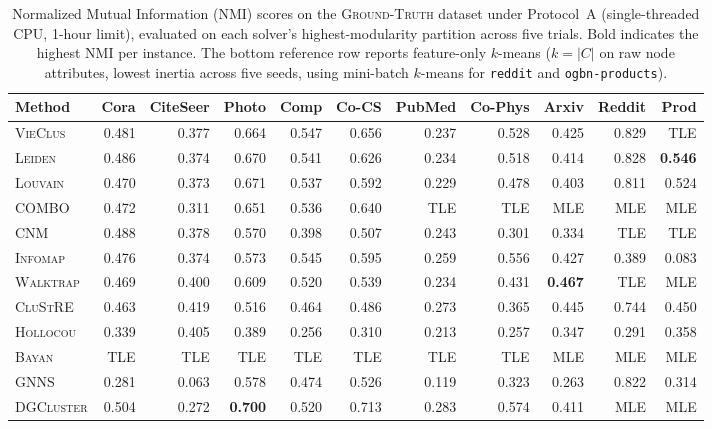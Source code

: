 \documentclass[11pt,a4paper]{article}
\begin{document}
\begin{table}[H]
    \centering
    \caption{Normalized Mutual Information (NMI) scores on the \textsc{Ground-Truth} dataset under Protocol~A (single-threaded CPU, 1-hour limit), evaluated on each solver's highest-modularity partition across five trials. Bold indicates the highest NMI per instance. The bottom reference row reports feature-only $k$-means ($k = |C|$ on raw node attributes, lowest inertia across five seeds, using mini-batch $k$-means for \texttt{reddit} and \texttt{ogbn-products}).}
    \label{tab:nmi_gt}
    \vspace{0.5em}
    \small
    \setlength{\tabcolsep}{3.5pt}
    \begin{tabular*}{\textwidth}{@{\extracolsep{\fill}}l rrrrrrrrrr@{}}
        \toprule
        Method & Cora & CiteSeer & Photo & Comp & Co-CS & PubMed & Co-Phys & Arxiv & Reddit & Prod \\
        \midrule
        \textsc{VieClus} & 0.481 & 0.377 & 0.664 & 0.547 & 0.656 & 0.237 & 0.528 & 0.425 & 0.829 & TLE \\
        \textsc{Leiden} & 0.486 & 0.374 & 0.670 & 0.541 & 0.626 & 0.234 & 0.518 & 0.414 & 0.828 & \textbf{0.546} \\
        \textsc{Louvain} & 0.470 & 0.373 & 0.671 & 0.537 & 0.592 & 0.229 & 0.478 & 0.403 & 0.811 & 0.524 \\
        \textsc{COMBO} & 0.472 & 0.311 & 0.651 & 0.536 & 0.640 & TLE & TLE & MLE & MLE & MLE \\
        \textsc{CNM} & 0.488 & 0.378 & 0.570 & 0.398 & 0.507 & 0.243 & 0.301 & 0.334 & TLE & TLE \\
        \textsc{Infomap} & 0.476 & 0.374 & 0.573 & 0.545 & 0.595 & 0.259 & 0.556 & 0.427 & 0.389 & 0.083 \\
        \textsc{Walktrap} & 0.469 & 0.400 & 0.609 & 0.520 & 0.539 & 0.234 & 0.431 & \textbf{0.467} & TLE & MLE \\
        \textsc{CluStRE} & 0.463 & 0.419 & 0.516 & 0.464 & 0.486 & 0.273 & 0.365 & 0.445 & 0.744 & 0.450 \\
        \textsc{Hollocou} & 0.339 & 0.405 & 0.389 & 0.256 & 0.310 & 0.213 & 0.257 & 0.347 & 0.291 & 0.358 \\
        \textsc{Bayan} & TLE & TLE & TLE & TLE & TLE & TLE & TLE & MLE & MLE & MLE \\
        \midrule
        \textsc{GNNS} & 0.281 & 0.063 & 0.578 & 0.474 & 0.526 & 0.119 & 0.323 & 0.263 & 0.822 & 0.314 \\
        \textsc{DGCluster} & 0.504 & 0.272 & \textbf{0.700} & 0.520 & 0.713 & 0.283 & 0.574 & 0.411 & MLE & MLE \\

\end{tabular*}
\end{table}
\end{document}
